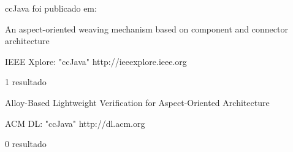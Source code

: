 ccJava foi publicado em:

An aspect-oriented weaving mechanism based on component and connector architecture

IEEE Xplore: "ccJava"
http://ieeexplore.ieee.org

1 resultado

Alloy-Based Lightweight Verification for Aspect-Oriented Architecture

ACM DL: "ccJava"
http://dl.acm.org

0 resultado

